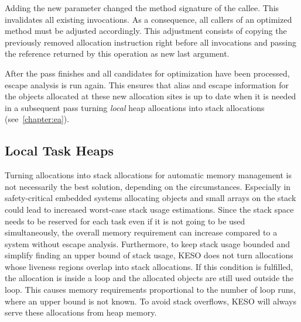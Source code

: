			Adding the new parameter changed the method signature of the callee. This invalidates all existing invocations. As
			a consequence, all callers of an optimized method must be adjusted accordingly. This adjustment consists of
			copying the previously removed allocation instruction right before all invocations and passing the reference
			returned by this operation as new last argument.

			After the pass finishes and all candidates for optimization have been processed, escape analysis is run again.
			This ensures that alias and escape information for the objects allocated at these new allocation sites is up to
			date when it is needed in a subsequent pass turning \emph{local} heap allocations into stack allocations
			(see~\cref{chapter:ea}).

		\subsection{Local Task Heaps}
			\label{sub:eea:opt:ldh}
			Turning allocations into stack allocations for automatic memory management is not necessarily the best solution,
			depending on the circumstances. Especially in safety-critical embedded systems allocating objects and small arrays
			on the stack could lead to increased worst-case stack usage estimations. Since the stack space needs to be
			reserved for each task even if it is not going to be used simultaneously, the overall memory requirement can
			increase compared to a system without escape analysis. Furthermore, to keep stack usage bounded and simplify
			finding an upper bound of stack usage, KESO does not turn allocations whose liveness regions overlap into stack
			allocations. If this condition is fulfilled, the allocation is inside a loop and the allocated objects are still
			used outside the loop. This causes memory requirements proportional to the number of loop runs, where an upper
			bound is not known. To avoid stack overflows, KESO will always serve these allocations from heap memory.

